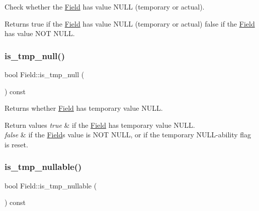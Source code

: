 Check whether the \mbox{\hyperlink{classField}{Field}} has value N\+U\+LL (temporary or actual).

\begin{DoxyReturn}{Returns}
true if the \mbox{\hyperlink{classField}{Field}} has value N\+U\+LL (temporary or actual) false if the \mbox{\hyperlink{classField}{Field}} has value N\+OT N\+U\+LL. 
\end{DoxyReturn}
\mbox{\label{classField_aacac876b52d64a83e40403fcd78b199e}} 
\subsubsection{\texorpdfstring{is\+\_\+tmp\+\_\+null()}{is\_tmp\_null()}}
{\footnotesize\ttfamily bool Field\+::is\+\_\+tmp\+\_\+null (\begin{DoxyParamCaption}{ }\end{DoxyParamCaption}) const\hspace{0.3cm}{\ttfamily [inline]}}

\begin{DoxyReturn}{Returns}
whether \mbox{\hyperlink{classField}{Field}} has temporary value N\+U\+LL. 
\end{DoxyReturn}

\begin{DoxyRetVals}{Return values}
{\em true} & if the \mbox{\hyperlink{classField}{Field}} has temporary value N\+U\+LL. \\
\hline
{\em false} & if the \mbox{\hyperlink{classField}{Field}}\textquotesingle{}s value is N\+OT N\+U\+LL, or if the temporary N\+U\+LL-\/ability flag is reset. \\
\hline
\end{DoxyRetVals}
\mbox{\label{classField_a7a61056ae427bbcd7e7ac2efbbf25bd0}} 
\subsubsection{\texorpdfstring{is\+\_\+tmp\+\_\+nullable()}{is\_tmp\_nullable()}}
{\footnotesize\ttfamily bool Field\+::is\+\_\+tmp\+\_\+nullable (\begin{DoxyParamCaption}{ }\end{DoxyParamCaption}) const\hspace{0.3cm}{\ttfamily [inline]}}

